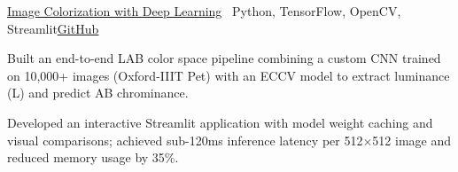 \begin{cvproject}{\href{https://github.com/grvsnh/Image-Colorization}{\uline{Image Colorization with Deep Learning}} \textbar\ Python, TensorFlow, OpenCV, Streamlit}{\href{https://github.com/grvsnh/Image-Colorization}{\uline{GitHub}}}
    \item Built an end-to-end LAB color space pipeline combining a custom CNN trained on 10,000+ images (Oxford-IIIT Pet) with an ECCV model to extract luminance (L) and predict AB chrominance.
    \item Developed an interactive Streamlit application with model weight caching and visual comparisons; achieved sub-120ms inference latency per 512$\times$512 image and reduced memory usage by 35\%.
\end{cvproject}